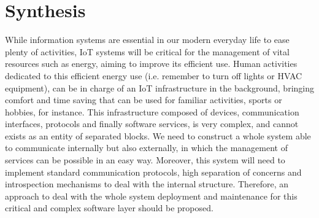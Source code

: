 \section{Synthesis}
While information systems are essential in our modern everyday life to ease plenty of activities, IoT systems will be critical for the management of vital resources such as energy, aiming to improve its efficient use.
Human activities dedicated to this efficient energy use (i.e. remember to turn off lights or HVAC equipment), can be in charge of an IoT infrastructure in the background, bringing comfort and time saving that can be used for familiar activities, sports or hobbies, for instance.
This infrastructure composed of devices, communication interfaces, protocols and finally software services, is very complex, and cannot exists as an entity of separated blocks.
We need to construct a whole system able to communicate internally but also externally, in which the management of services can be possible in an easy way.
Moreover, this system will need to implement standard communication protocols, high separation of concerns and introspection mechanisms to deal with the internal structure.
Therefore, an approach to deal with the whole system deployment and maintenance for this critical and complex software layer should be proposed.

